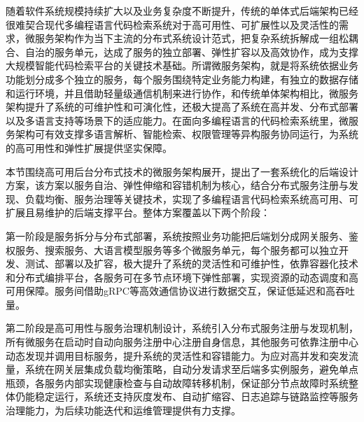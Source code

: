 \documentclass[UTF8,a4paper,12pt]{ctexart}
\numberwithin{equation}{section}
\begin{document}
随着软件系统规模持续扩大以及业务复杂度不断提升，传统的单体式后端架构已经很难契合现代多编程语言代码检索系统对于高可用性、可扩展性以及灵活性的需求，微服务架构作为当下主流的分布式系统设计范式，把复杂系统拆解成一组松耦合、自治的服务单元，达成了服务的独立部署、弹性扩容以及高效协作，成为支撑大规模智能代码检索平台的关键技术基础。所谓微服务架构，就是将系统依据业务功能划分成多个独立的服务，每个服务围绕特定业务能力构建，有独立的数据存储和运行环境，并且借助轻量级通信机制来进行协作，和传统单体架构相比，微服务架构提升了系统的可维护性和可演化性，还极大提高了系统在高并发、分布式部署以及多语言支持等场景下的适应能力。在面向多编程语言的代码检索系统里，微服务架构可有效支撑多语言解析、智能检索、权限管理等异构服务协同运行，为系统的高可用性和弹性扩展提供坚实保障。\par
本节围绕高可用后台分布式技术的微服务架构展开，提出了一套系统化的后端设计方案，该方案以服务自治、弹性伸缩和容错机制为核心，结合分布式服务注册与发现、负载均衡、服务治理等关键技术，实现了多编程语言代码检索系统高可用、可扩展且易维护的后端支撑平台。整体方案覆盖以下两个阶段：\par
第一阶段是服务拆分与分布式部署，系统按照业务功能把后端划分成网关服务、鉴权服务、搜索服务、大语言模型服务等多个微服务单元，每个服务都可以独立开发、测试、部署以及扩容，极大提升了系统的灵活性和可维护性，依靠容器化技术和分布式编排平台，各服务可在多节点环境下弹性部署，实现资源的动态调度和高可用保障。服务间借助gRPC等高效通信协议进行数据交互，保证低延迟和高吞吐量。\par
第二阶段是高可用性与服务治理机制设计，系统引入分布式服务注册与发现机制，所有微服务在启动时自动向服务注册中心注册自身信息，其他服务可依靠注册中心动态发现并调用目标服务，提升系统的灵活性和容错能力。为应对高并发和突发流量，系统在网关层集成负载均衡策略，自动分发请求至后端多实例服务，避免单点瓶颈，各服务内部实现健康检查与自动故障转移机制，保证部分节点故障时系统整体仍能稳定运行，系统还支持灰度发布、自动扩缩容、日志追踪与链路监控等服务治理能力，为后续功能迭代和运维管理提供有力支撑。\par
\end{document}
